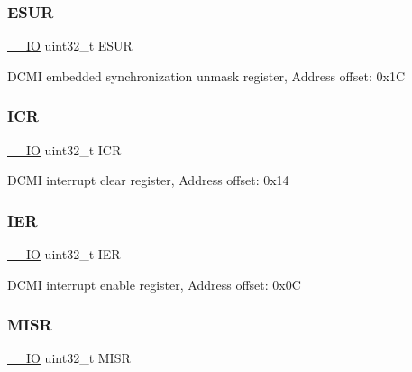 \subsubsection{\texorpdfstring{E\+S\+UR}{ESUR}}
{\footnotesize\ttfamily \mbox{\hyperlink{core__sc300_8h_aec43007d9998a0a0e01faede4133d6be}{\+\_\+\+\_\+\+IO}} uint32\+\_\+t E\+S\+UR}

D\+C\+MI embedded synchronization unmask register, Address offset\+: 0x1C \mbox{\label{struct_d_c_m_i___type_def_a0a8c8230846fd8ff154b9fde8dfa0399}} 
\subsubsection{\texorpdfstring{I\+CR}{ICR}}
{\footnotesize\ttfamily \mbox{\hyperlink{core__sc300_8h_aec43007d9998a0a0e01faede4133d6be}{\+\_\+\+\_\+\+IO}} uint32\+\_\+t I\+CR}

D\+C\+MI interrupt clear register, Address offset\+: 0x14 \mbox{\label{struct_d_c_m_i___type_def_a6566f8cfbd1d8aa7e8db046aa35e77db}} 
\subsubsection{\texorpdfstring{I\+ER}{IER}}
{\footnotesize\ttfamily \mbox{\hyperlink{core__sc300_8h_aec43007d9998a0a0e01faede4133d6be}{\+\_\+\+\_\+\+IO}} uint32\+\_\+t I\+ER}

D\+C\+MI interrupt enable register, Address offset\+: 0x0C \mbox{\label{struct_d_c_m_i___type_def_a524e134cec519206cb41d0545e382978}} 
\subsubsection{\texorpdfstring{M\+I\+SR}{MISR}}
{\footnotesize\ttfamily \mbox{\hyperlink{core__sc300_8h_aec43007d9998a0a0e01faede4133d6be}{\+\_\+\+\_\+\+IO}} uint32\+\_\+t M\+I\+SR}

